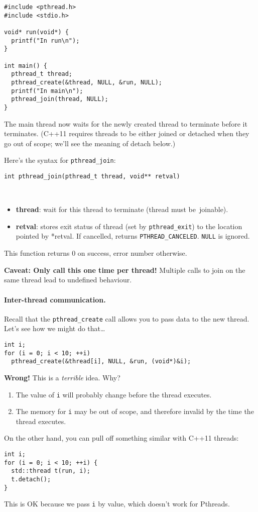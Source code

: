 \begin{verbatim}
#include <pthread.h>
#include <stdio.h>

void* run(void*) {
  printf("In run\n");
}

int main() {
  pthread_t thread;
  pthread_create(&thread, NULL, &run, NULL);
  printf("In main\n");
  pthread_join(thread, NULL);
}
\end{verbatim}

The main thread now waits for the newly created thread to terminate
before it terminates. (C++11 requires threads to be either joined or
detached when they go out of scope; we'll see the meaning of detach below.)

Here's the syntax for {\tt pthread\_join}:

\begin{verbatim}
int pthread_join(pthread_t thread, void** retval)
\end{verbatim}
~\vspace*{-3em}
\begin{itemize}
\item  {\bf thread}: wait for this thread to terminate (thread must be~joinable).

\item  {\bf retval}: stores exit status of thread (set by {\tt pthread\_exit}) to
                 the location pointed by *retval. If cancelled, returns
                 {\tt PTHREAD\_CANCELED}. {\tt NULL} is ignored.
\end{itemize}

This function returns 0 on success, error number otherwise.

 {\bf Caveat: Only call this one time per thread!} Multiple calls to join on the same thread
  lead to undefined behaviour.

\paragraph{Inter-thread communication.} Recall that the {\tt pthread\_create} 
call allows you to pass data to the new thread. Let's see how we might do that\ldots

\begin{verbatim}
int i;
for (i = 0; i < 10; ++i)
  pthread_create(&thread[i], NULL, &run, (void*)&i);
\end{verbatim}

{\bf Wrong!} This is a \emph{terrible} idea. Why?
\begin{enumerate}
    \item The value of {\tt i} will probably change before the thread executes.
    \item The memory for {\tt i} may be out of scope, and therefore invalid by
          the time the thread executes.
\end{enumerate}
On the other hand, you can pull off something similar with C++11 threads:
\begin{verbatim}
int i;
for (i = 0; i < 10; ++i) {
  std::thread t(run, i);
  t.detach();
}
\end{verbatim}
This is OK because we pass {\tt i} by value, which doesn't work for Pthreads.

